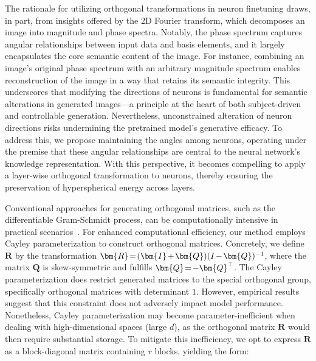 The rationale for utilizing orthogonal transformations in neuron finetuning draws, in part, from insights offered by the 2D Fourier transform, which decomposes an image into magnitude and phase spectra. Notably, the phase spectrum captures angular relationships between input data and basis elements, and it largely encapsulates the core semantic content of the image. For instance, combining an image’s original phase spectrum with an arbitrary magnitude spectrum enables reconstruction of the image in a way that retains its semantic integrity. This underscores that modifying the directions of neurons is fundamental for semantic alterations in generated images—a principle at the heart of both subject-driven and controllable generation. Nevertheless, unconstrained alteration of neuron directions risks undermining the pretrained model’s generative efficacy. To address this, we propose maintaining the angles among neurons, operating under the premise that these angular relationships are central to the neural network’s knowledge representation. With this perspective, it becomes compelling to apply a layer-wise orthogonal transformation to neurons, thereby ensuring the preservation of hyperspherical energy across layers.

Conventional approaches for generating orthogonal matrices, such as the differentiable Gram-Schmidt process, can be computationally intensive in practical scenarios~\cite{liu2021orthogonal}. For enhanced computational efficiency, our method employs Cayley parameterization to construct orthogonal matrices. Concretely, we define $\bm{R}$ by the transformation $\thickmuskip=2mu \medmuskip=2mu \bm{R}=(\bm{I}+\bm{Q})(I-\bm{Q})^{-1}$, where the matrix $\bm{Q}$ is skew-symmetric and fulfills $\thickmuskip=2mu \medmuskip=2mu \bm{Q}=-\bm{Q}^\top$. The Cayley parameterization does restrict generated matrices to the special orthogonal group, specifically orthogonal matrices with determinant $1$. However, empirical results suggest that this constraint does not adversely impact model performance. Nonetheless, Cayley parameterization may become parameter-inefficient when dealing with high-dimensional spaces (large $d$), as the orthogonal matrix $\bm{R}$ would then require substantial storage. To mitigate this inefficiency, we opt to express $\bm{R}$ as a block-diagonal matrix containing $r$ blocks, yielding the form:

